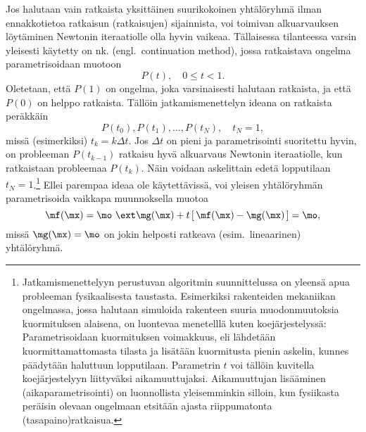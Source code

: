 Jos halutaan vain ratkaista yksittäinen suurikokoinen yhtälöryhmä ilman ennakkotietoa
ratkaisun (ratkaisujen) sijainnista, voi toimivan alkuarvauksen löytäminen Newtonin
iteraatiolle olla hyvin vaikeaa. Tällaisessa tilanteessa varsin yleisesti käytetty on nk.
 (engl.\ continuation method), jossa ratkaistava ongelma 
parametrisoidaan muotoon
\[
P(t),\quad 0\leq t<1.
\]
Oletetaan, että $P(1)$ on ongelma, joka varsinaisesti halutaan ratkaista, ja että $P(0)$ on 
helppo ratkaista. Tällöin jatkamismenettelyn ideana on ratkaista peräkkäin
\[
P(t_0),P(t_1),\ldots,P(t_N),\quad t_N=1,
\]
missä (esimerkiksi) $t_k=k\Delta t$. Jos $\Delta t$ on pieni ja parametrisointi suoritettu 
hyvin, on probleeman $P(t_{k-1})$ ratkaisu hyvä alkuarvaus Newtonin iteraatiolle, kun 
ratkaistaan probleemaa $P(t_k)$. Näin voidaan askelittain edetä lopputilaan
$t_N=1$.\footnote[2]{Jatkamismenettelyyn perustuvan algoritmin suunnittelussa on yleensä
apua probleeman fysikaalisesta taustasta. Esimerkiksi rakenteiden mekaniikan ongelmassa, jossa
halutaan simuloida rakenteen suuria muodonmuutoksia kuormituksen alaisena, on luontevaa
menetelllä kuten koejärjestelyssä: Parametrisoidaan kuormituksen voimakkuus, eli lähdetään
kuormittamattomasta tilasta ja lisätään kuormitusta pienin askelin, kunnes päädytään haluttuun
lopputilaan. Parametrin $t$ voi tällöin kuvitella koejärjestelyyn liittyväksi 
aikamuuttujaksi. Aikamuuttujan lisääminen (aikaparametrisointi) on luonnollista
yleisemminkin silloin, kun fysiikasta peräisin olevaan ongelmaan etsitään ajasta riippumatonta
(tasapaino)ratkaisua.}
Ellei parempaa ideaa ole käytettävissä, voi yleisen yhtälöryhmän parametrisoida vaikkapa
muunnoksella muotoa
\[
\mf(\mx)=\mo\ \ext\ \\ \mg(\mx)+t\,[\,\mf(\mx)-\mg(\mx)\,]=\mo,
\]
missä $\mg(\mx)=\mo$ on jokin helposti ratkeava (esim.\ lineaarinen) yhtälöryhmä.
